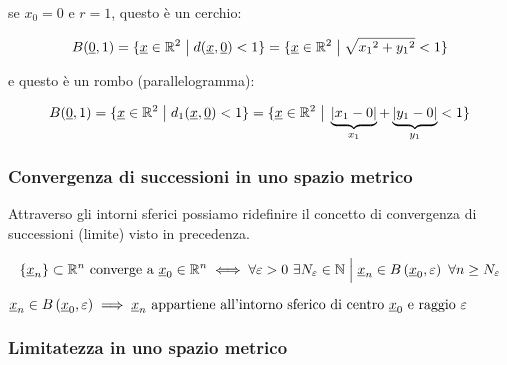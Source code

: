 se \(x_0=0\) e \(r=1\), questo è un cerchio:

\[
    B(\uzero,1) = \{\ux \in \R^2 \giventhat d(\ux,\uzero) <1\} = \{\ux \in \R^2 \giventhat \sqrt{{x_1}^2+{y_1}^2}<1\}
\]

e questo è un rombo (parallelogramma):

\[
    B(\uzero,1) = \{\ux \in \R^2 \giventhat d_1(\ux,\uzero) <1\} = \{\ux \in \R^2 \giventhat \underbrace{|x_1-0|}_{x_1} + \underbrace{|y_1-0|}_{y_1}<1\}
\]

\pagebreak

\subsubsection{Convergenza di successioni in uno spazio metrico}

Attraverso gli intorni sferici possiamo ridefinire il concetto di convergenza di successioni (limite) visto in precedenza.

\begin{align*}
    \{\ux_n\} \subset \Rn \text{ converge a } \ux_0 \in \Rn
    \iff
    \forall \varepsilon >0 ~\exists N_\varepsilon \in \N
    \giventhat[\Big]
    \ux_n \in B\left(\ux_0,\varepsilon\right) ~\forall n \ge N_\varepsilon
\end{align*}

\(
\ux_n \in B\left(\ux_0,\varepsilon\right) \implies \ux_n \text{ appartiene all'intorno sferico di centro } \ux_0 \text{ e raggio } \varepsilon
\)

\pagebreak

\subsubsection{Limitatezza in uno spazio metrico}



